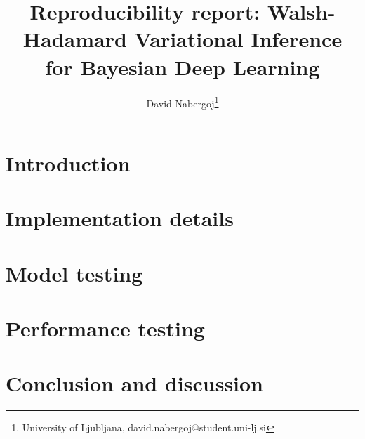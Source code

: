 \documentclass[11pt, twocolumn]{article}
\title{Reproducibility report: Walsh-Hadamard Variational Inference for Bayesian Deep Learning}
\author{David Nabergoj\thanks{University of Ljubljana, david.nabergoj@student.uni-lj.si}}
\begin{document}
    \maketitle

    \section{Introduction}\label{sec:introduction}
    

    \section{Implementation details}\label{sec:implementation-details}
    

    \section{Model testing}\label{sec:model-testing}
    

    \section{Performance testing}\label{sec:performance-testing}
    

    \section{Conclusion and discussion}\label{sec:conclusion-and-discussion}
    

    
    
\end{document}
